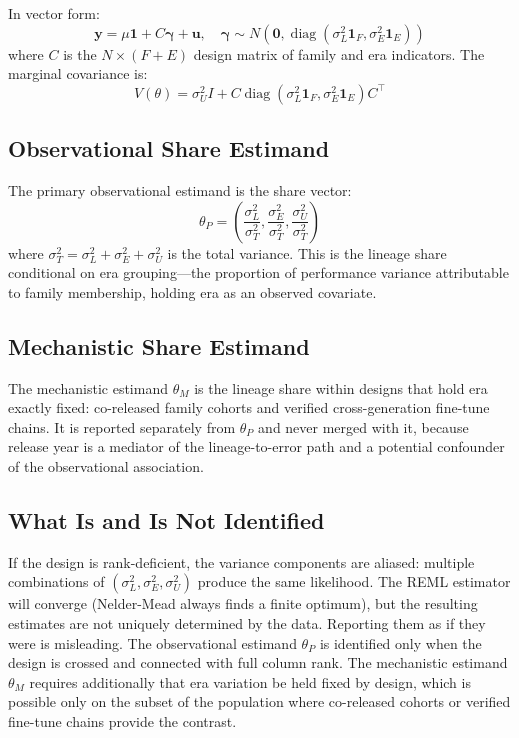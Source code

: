 \documentclass[journal]{IEEEtran}
\begin{document}
In vector form:
\begin{equation}
\mathbf{y} = \mu \mathbf{1} + C \boldsymbol{\gamma} + \mathbf{u}, \quad \boldsymbol{\gamma} \sim N(\mathbf{0}, \operatorname{diag}(\sigma^2_L \mathbf{1}_F, \sigma^2_E \mathbf{1}_E))
\label{eq:vecform}
\end{equation}
where $C$ is the $N \times (F + E)$ design matrix of family and era indicators. The marginal covariance is:
\begin{equation}
V(\theta) = \sigma^2_U I + C \operatorname{diag}(\sigma^2_L \mathbf{1}_F, \sigma^2_E \mathbf{1}_E) C^\top
\label{eq:cov}
\end{equation}

\subsection{Observational Share Estimand}

The primary observational estimand is the share vector:
\begin{equation}
\theta_P = \left( \frac{\sigma^2_L}{\sigma^2_T}, \frac{\sigma^2_E}{\sigma^2_T}, \frac{\sigma^2_U}{\sigma^2_T} \right)
\label{eq:share}
\end{equation}
where $\sigma^2_T = \sigma^2_L + \sigma^2_E + \sigma^2_U$ is the total variance. This is the lineage share conditional on era grouping---the proportion of performance variance attributable to family membership, holding era as an observed covariate.

\subsection{Mechanistic Share Estimand}

The mechanistic estimand $\theta_M$ is the lineage share within designs that hold era exactly fixed: co-released family cohorts and verified cross-generation fine-tune chains. It is reported separately from $\theta_P$ and never merged with it, because release year is a mediator of the lineage-to-error path and a potential confounder of the observational association.

\subsection{What Is and Is Not Identified}

If the design is rank-deficient, the variance components are aliased: multiple combinations of $(\sigma^2_L, \sigma^2_E, \sigma^2_U)$ produce the same likelihood. The REML estimator will converge (Nelder-Mead always finds a finite optimum), but the resulting estimates are not uniquely determined by the data. Reporting them as if they were is misleading. The observational estimand $\theta_P$ is identified only when the design is crossed and connected with full column rank. The mechanistic estimand $\theta_M$ requires additionally that era variation be held fixed by design, which is possible only on the subset of the population where co-released cohorts or verified fine-tune chains provide the contrast.
\end{document}
